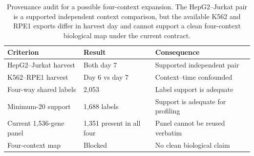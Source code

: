 \begin{table}[H]
\centering
\caption{Provenance audit for a possible four-context expansion. The
HepG2--Jurkat pair is a supported independent context comparison, but the
available K562 and RPE1 exports differ in harvest day and cannot support a
clean four-context biological map under the current contract.}
\label{tab:context-audit}
\small
\begin{tabular}{lll}
\toprule
Criterion & Result & Consequence \\
\midrule
HepG2--Jurkat harvest & Both day 7 & Supported independent pair \\
K562--RPE1 harvest & Day 6 vs day 7 & Context--time confounded \\
Four-way shared labels & 2,053 & Label support is adequate \\
Minimum-20 support & 1,688 labels & Support is adequate for profiling \\
Current 1,536-gene panel & 1,351 present in all four & Panel cannot be reused verbatim \\
Four-context map & Blocked & No clean biological claim \\
\bottomrule
\end{tabular}
\end{table}
